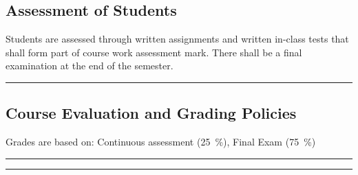 \subsection*{Assessment of Students}
\begin{outline}
    \1 Students are assessed through written assignments and written in-class tests that shall form part of course work assessment mark.
    \1 There shall be a final examination at the end of the semester.
\end{outline}
\vspace{2ex}\hrule\vspace{2ex}

\subsection*{Course Evaluation and Grading Policies}
Grades are based on:
Continuous assessment (\qty{25}{\percent}),
Final Exam (\qty{75}{\percent})
\vspace{2ex}\hrule
\vspace{2ex}\hrule\vspace{2ex}



